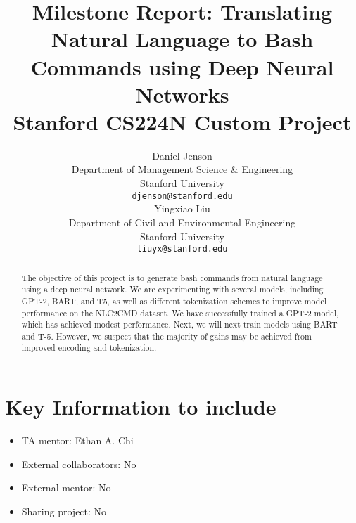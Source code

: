 \documentclass{article}
\title{
  Milestone Report: Translating Natural Language to Bash Commands using Deep Neural Networks \\
  \vspace{1em}
  \small{\normalfont Stanford CS224N Custom Project  }
}
\author{
 Daniel Jenson \\
  Department of Management Science \& Engineering \\
  Stanford University \\
  \texttt{djenson@stanford.edu} \\
  \And
  Yingxiao Liu \\
  Department of Civil and Environmental Engineering \\
  Stanford University \\
  \texttt{liuyx@stanford.edu} \\
}
\begin{document}
\maketitle

\begin{abstract}
	The objective of this project is to generate bash commands from natural
	language using a deep neural network. We are experimenting with several models,
	including GPT-2, BART, and T5, as well as different tokenization schemes to
	improve model performance on the NLC2CMD dataset. We have successfully
	trained a GPT-2 model, which has achieved modest performance. Next, we will
	next train models using BART and T-5. However, we suspect that the majority
	of gains may be achieved from improved encoding and tokenization.
\end{abstract}


\section{Key Information to include}
\begin{itemize}
	\item TA mentor: Ethan A. Chi
	\item External collaborators: No
	\item External mentor: No
	\item Sharing project: No
\end{itemize}

\end{document}
